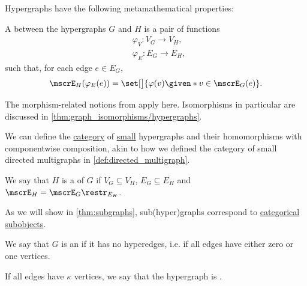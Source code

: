 \begin{definition}
  Hypergraphs have the following metamathematical properties:
  \begin{thmenum}[resume=def:hypergraph]
     A  between the hypergraphs \( G \) and \( H \) is a pair of functions
    \begin{align*}
      &\varphi_V: V_G \to V_H, \\
      &\varphi_E: E_G \to E_H,
    \end{align*}
    such that, for each edge \( e \in E_G \),
    \begin{equation}\label{eq:def:hypergraph/morphism}
      \mscrE_H(\varphi_E(e)) = \set[\big]{ \varphi(v) \given* v \in \mscrE_G(e) }.
    \end{equation}

    The morphism-related notions from  apply here. Isomorphisms in particular are discussed in \cref{thm:graph_isomorphisms/hypergraphs}.

     We can define the \hyperref[def:category]{category} of \hyperref[def:small_set]{small} hypergraphs and their homomorphisms with componentwise composition, akin to how we defined the category of small directed multigraphs in \cref{def:directed_multigraph}.

    \mimprovised We say that \( H \) is a  of \( G \) if \( V_G \subseteq V_H \), \( E_G \subseteq E_H \) and \( \mscrE_H = \mscrE_G\restr_{E_H} \).

    As we will show in \cref{thm:subgraphs}, sub(hyper)graphs correspond to \hyperref[def:categorical_subobject]{categorical subobjects}.

     We say that \( G \) is an  if it has no hyperedges, i.e. if all edges have either zero or one vertices.

     If all edges have \( \kappa \) vertices, we say that the hypergraph is .
  \end{thmenum}
\end{definition}
